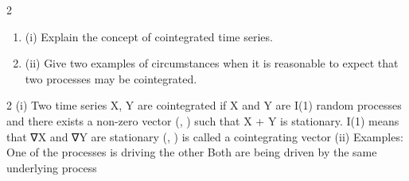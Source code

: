 \documentclass[a4paper,12pt]{article}
\begin{document}
2
\begin{enumerate}
\item (i) Explain the concept of cointegrated time series.
\item (ii) Give two examples of circumstances when it is reasonable to expect that two
processes may be cointegrated.
\end{enumerate}

2
(i)
Two time series X, Y are cointegrated if X and Y are I(1) random processes and there exists a non-zero vector (\alpha , \beta ) such that \alpha X + \beta Y is stationary.
I(1) means that ∇X and ∇Y are stationary (\alpha , \beta ) is called a cointegrating vector
(ii)
Examples:
One of the processes is driving the other
Both are being driven by the same underlying process
\end{document}
